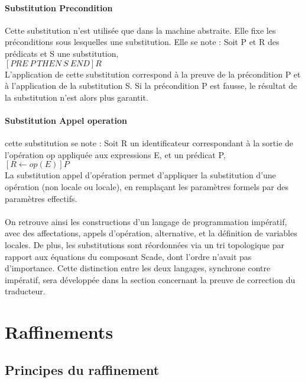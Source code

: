 \paragraph{Substitution Precondition}
Cette substitution n'est utilisée que dans la machine abstraite. Elle fixe les
préconditions sous lesquelles une substitution. Elle se note : Soit P
et R des prédicats et S une substitution,\\ 
$[PRE~ P~ THEN~ S~ END]R$\\
L'application de cette substitution correspond à la preuve de la
précondition P et à l'application de la substitution S. Si la
précondition P est fausse, le résultat de la substitution n'est alors
plus garantit.

\paragraph{Substitution Appel operation}
cette substitution se note : Soit R un identificateur correspondant à la sortie
de l'opération op appliquée aux expressions E, et un prédicat P,\\
$[R\leftarrow op(E)]P$\\
La  substitution appel d’opération permet d’appliquer la substitution
d’une opération (non locale ou locale), en remplaçant les paramètres
formels par des paramètres effectifs. 

\paragraph{}
On retrouve ainsi les constructions d'un langage de programmation
impératif, avec des affectations, appels d'opération, alternative, et la
définition de variables locales. De plus, les substitutions sont
réordonnées via un tri topologique par rapport aux équations du composant
Scade, dont l'ordre n'avait pas d'importance. Cette distinction entre
les deux langages, synchrone contre impératif, sera développée dans la
section concernant la preuve de correction du traducteur.



\section{Raffinements}

\subsection{Principes du raffinement}

